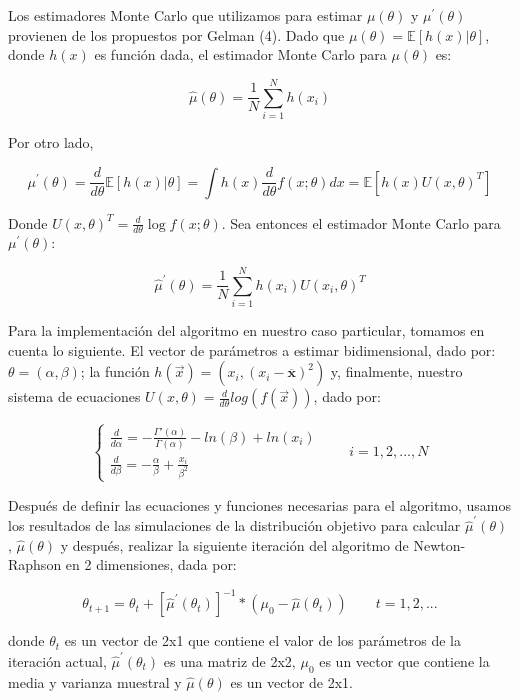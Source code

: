 \documentclass[9pt,twocolumn,twoside,]{pnas-new}
\begin{document}
Los estimadores Monte Carlo que utilizamos para estimar \(\mu(\theta)\)
y \(\mu^{\prime}(\theta)\) provienen de los propuestos por Gelman (4).
Dado que \(\mu(\theta) = \mathbb{E}[h(x)|\theta]\), donde \(h(x)\) es
función dada, el estimador Monte Carlo para \(\mu(\theta)\) es:

\[\hat{\mu}(\theta) = \frac{1}{N} \sum_{i = 1}^{N} h(x_{i})\]

Por otro lado,

\[\mu^{\prime}(\theta) = \frac{d}{d\theta}\mathbb{E}[h(x)|\theta] = \int h(x) \frac{d}{d\theta} f(x;\theta) dx = \mathbb{E}[h(x)U(x,\theta)^{T}]\]

Donde \(U(x,\theta)^{T} = \frac{d}{d\theta} \log{f(x;\theta)}\). Sea
entonces el estimador Monte Carlo para \(\mu^{\prime}(\theta)\):

\[\hat{\mu}^{\prime}(\theta) = \frac{1}{N} \sum_{i = 1}^{N} h(x_{i})U(x_{i},\theta)^{T}\]

Para la implementación del algoritmo en nuestro caso particular, tomamos
en cuenta lo siguiente. El vector de parámetros a estimar bidimensional,
dado por: \(\theta=(\alpha,\beta)\); la función
\(h(\vec{x})=(x_i, (x_i - \overline{\mathbf{x}})^{2})\) y, finalmente,
nuestro sistema de ecuaciones
\(U(x,\theta)=\frac{d}{d\theta}log(f(\vec{x}))\), dado por:

\[ \begin{cases} \frac{d}{d\alpha}=-\frac{\Gamma'(\alpha)}{\Gamma(\alpha)}-ln(\beta)+ln(x_i) \\ \frac{d}{d\beta}= -\frac{\alpha}{\beta} + \frac{x_i}{\beta^{2}}  \end{cases} \qquad i=1,2,...,N \]

Después de definir las ecuaciones y funciones necesarias para el
algoritmo, usamos los resultados de las simulaciones de la distribución
objetivo para calcular \(\hat{\mu}^{\prime}(\theta)\),
\(\hat{\mu}(\theta)\) y después, realizar la siguiente iteración del
algoritmo de Newton-Raphson en 2 dimensiones, dada por:

\[ \theta_{t+1} = \theta_t + [\hat{\mu}^{\prime}(\theta_t)]^{-1}*(\mu_0 - \hat{\mu}(\theta_t)) \qquad t=1,2,... \]

donde \(\theta_t\) es un vector de 2x1 que contiene el valor de los
parámetros de la iteración actual, \(\hat{\mu}^{\prime}(\theta_t)\) es
una matriz de 2x2, \(\mu_0\) es un vector que contiene la media y
varianza muestral y \(\hat{\mu}(\theta)\) es un vector de 2x1.
\end{document}
